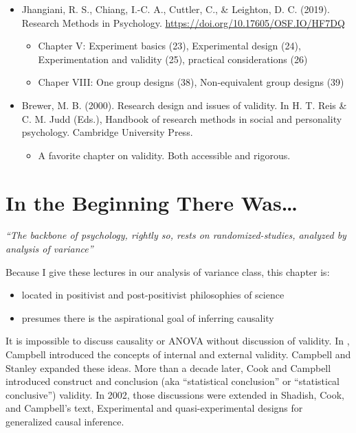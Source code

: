 \documentclass[
  english,
]{book}
\providecommand{\tightlist}{%
  \setlength{\itemsep}{0pt}\setlength{\parskip}{0pt}}
\begin{document}
\begin{itemize}
\tightlist
\item
  Jhangiani, R. S., Chiang, I.-C. A., Cuttler, C., \& Leighton, D. C. (2019). Research Methods in Psychology. \url{https://doi.org/10.17605/OSF.IO/HF7DQ}

  \begin{itemize}
  \tightlist
  \item
    Chapter V: Experiment basics (23), Experimental design (24), Experimentation and validity (25), practical considerations (26)
  \item
    Chaper VIII: One group designs (38), Non-equivalent group designs (39)
  \end{itemize}
\item
  Brewer, M. B. (2000). Research design and issues of validity. In H. T. Reis \& C. M. Judd (Eds.), Handbook of research methods in social and personality psychology. Cambridge University Press.

  \begin{itemize}
  \tightlist
  \item
    A favorite chapter on validity. Both accessible and rigorous.
  \end{itemize}
\end{itemize}

\hypertarget{in-the-beginning-there-was}{%
\section{In the Beginning There Was\ldots{}}\label{in-the-beginning-there-was}}

\emph{``The backbone of psychology, rightly so, rests on randomized-studies, analyzed by analysis of variance''} \citep{kenny_enhancing_2019}

Because I give these lectures in our analysis of variance class, this chapter is:

\begin{itemize}
\tightlist
\item
  located in positivist and post-positivist philosophies of science
\item
  presumes there is the aspirational goal of inferring causality
\end{itemize}

It is impossible to discuss causality or ANOVA without discussion of validity. In \citeyearpar{campbell_factors_1957}, Campbell introduced the concepts of internal and external validity. Campbell and Stanley \citeyearpar{campbell_experimental_1963-1} expanded these ideas. More than a decade later, Cook and Campbell \citeyearpar{cook_quasi-experimentation_1979} introduced construct and conclusion (aka ``statistical conclusion'' or ``statistical conclusive'') validity. In 2002, those discussions were extended in Shadish, Cook, and Campbell's \citeyearpar{shadish_experimental_2002} text, Experimental and quasi-experimental designs for generalized causal inference.
\end{document}
